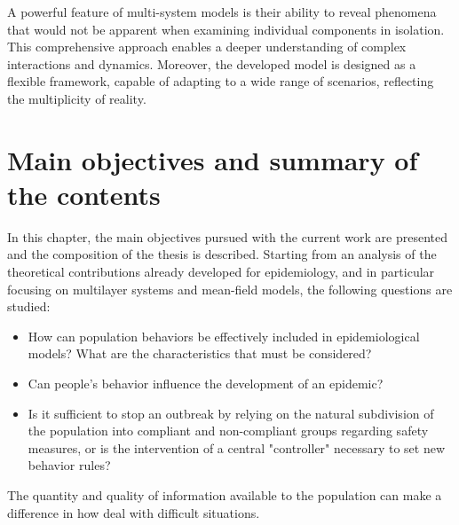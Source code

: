 A powerful feature of multi-system models is their ability to reveal phenomena that would not be apparent when examining individual components in isolation. This comprehensive approach enables a deeper understanding of complex interactions and dynamics. Moreover, the developed model is designed as a flexible framework, capable of adapting to a wide range of scenarios, reflecting the multiplicity of reality. 

\chapter{Main objectives and summary of the contents}

In this chapter, the main objectives pursued with the current work are presented and the composition of the thesis is described. 
Starting from an analysis of the theoretical contributions already developed for epidemiology, and in particular focusing on multilayer systems and mean-field models, the following questions are studied:

\begin{itemize}
	\item How can population behaviors be effectively included in epidemiological models? What are the characteristics that must be considered?
	\item Can people's behavior influence the development of an epidemic?
	\item Is it sufficient to stop an outbreak by relying on the natural subdivision of the population into compliant and non-compliant groups regarding safety measures, or is the intervention of a central "controller" necessary to set new behavior rules?
\end{itemize}

The quantity and quality of information available to the population can make a difference in how deal with difficult situations.

